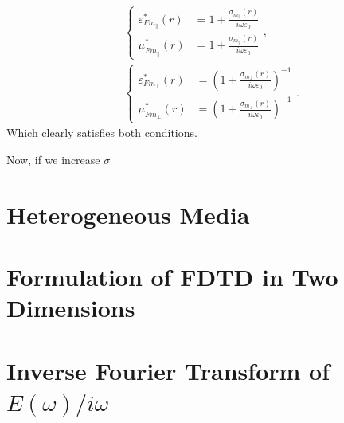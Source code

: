 \documentclass[12pt,twocolumn]{article}
\begin{document}
\begin{subequations}
\begin{align}
&\left\{
\begin{aligned}
\varepsilon_{Fm_\parallel}^*(r)&=1+\frac{\sigma_{m_\parallel}(r)}{i\omega\varepsilon_0}\\
\mu_{Fm_\parallel}^*(r)&=1+\frac{\sigma_{m_\parallel}(r)}{i\omega\varepsilon_0}
\end{aligned}\right.,\\
&\left\{
\begin{aligned}
\varepsilon_{Fm_\perp}^*(r)&=\left(1+\frac{\sigma_{m_\perp}(r)}{i\omega\varepsilon_0}\right)^{-1}\\
\mu_{Fm_\perp}^*(r)&=\left(1+\frac{\sigma_{m_\perp}(r)}{i\omega\varepsilon_0}\right)^{-1}
\end{aligned}\right..
\end{align}
\end{subequations}
Which clearly satisfies both conditions.

Now, if we increase $\sigma$


\section{Heterogeneous Media}

\section{Formulation of FDTD in Two Dimensions}





\newpage
\onecolumn
\appendix
\section{Inverse Fourier Transform of $E(\omega)/i\omega$}
\label{ap:fourier1}
\end{document}
